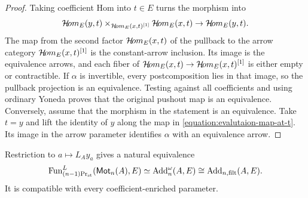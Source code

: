 \begin{proof}
Taking coefficient Hom into $t\in E$ turns the morphism into
\begin{align}\label{equation:evalutaion-map-at-t}
 \mathcal{H}\!om_E(y,t)
 \times_{\mathcal{H}\!om_E(x,t)^{[1]}}\mathcal{H}\!om_E(x,t)\to \mathcal{H}\!om_E(y,t).
\end{align}
The map from the second factor \(\mathcal{H}\!om_E(x,t)\) of the pullback to the arrow category \(\mathcal{H}\!om_E(x,t)^{[1]}\) is the constant-arrow inclusion. Its
image is the equivalence arrows, and each fiber of \(\mathcal{H}\!om_E(x,t)\to \mathcal{H}\!om_E(x,t)^{[1]}\) is either empty or contractible. If $\alpha$ is invertible, every postcomposition lies in that image, so the pullback projection is an equivalence. Testing
against all coefficients and using ordinary Yoneda proves that the
original pushout map is an equivalence. Conversely, assume that the morphism in the statement is an equivalence.
Take $t=y$ and
lift the identity of $y$ along the map in
\eqref{equation:evalutaion-map-at-t}. Its image
in the arrow parameter identifies $\alpha$ with an equivalence arrow.
\end{proof}

\begin{theorem}\label{thm:compact-presheaf-up}\label{thm:presheaf-universal}
Restriction to $a\mapsto L_Ay_a$ gives a natural equivalence
\begin{equation}\label{eq:compact-presheaf-up}
 \operatorname{Fun}^L_{{(n-1)}\mathrm{Pr}_{\mathrm{st}}}(\mathsf{Mot}_n(A),E)
 \simeq \operatorname{Add}_n^\omega(A,E)\cong \operatorname{Add}_{n,\mathrm{filt}}(A,E).
\end{equation}
It is compatible with every coefficient-enriched parameter.
\end{theorem}

